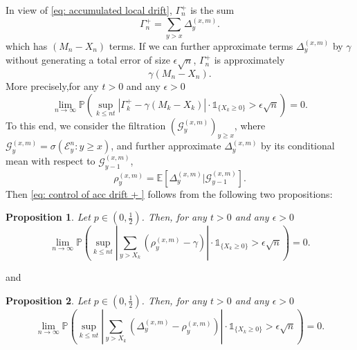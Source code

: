 \documentclass[twoside,12pt,a4paper]{article}
\newtheorem{proposition}{Proposition}[section]
\numberwithin{equation}{section}
\newcommand{\abs}[1]{\left\vert #1 \right\vert}
\begin{document}
In view of \eqref{eq: accumulated local drift}, $\Gamma_n^+$ is the sum 
$$
\Gamma_n^+ = \sum_{y>x} \Delta_y^{(x,m)}.
$$ which has $(M_n - X_n)$ terms. If we can further approximate terms $\Delta_y^{(x,m)}$ by $\gamma$ without generating a total error of size $\epsilon \sqrt{n}$, $\Gamma_n^+$ is approximately 
$$   
 \gamma (M_n - X_n).
$$
More precisely,for any $t>0$ and any $\epsilon >0$
\begin{equation}\label{eq: control of acc drift + }
	\lim_{n \to \infty }\mathbb{P}\left(\sup_{k\leq nt} \abs{\Gamma^+_k - \gamma \left(M_k - X_k \right)   }\cdot \mathbb{1}_{\{X_k\geq 0 \}} > \epsilon \sqrt{n}  \right) =0. 
\end{equation}
To this end, we consider the filtration $\left(\mathcal{G}_{y}^{(x,m)}\right)_{y\geq x}$, where $ \mathcal{G}_{y}^{(x,m)} = \sigma\left( \mathcal{E}^{n}_y : y \geq x \right)$, and further approximate $\Delta_y^{(x,m)}$ by its conditional mean with respect to $\mathcal{G}_{y-1}^{(x,m)}$,
\begin{equation}\label{eq: conditional mean}
	\rho_{y}^{(x,m)}= \mathbb{E}\left[\Delta_y^{(x,m)} | \mathcal{G}_{y-1}^{(x,m)}\right].
\end{equation}
Then \eqref{eq: control of acc drift + } follows from the following two propositions:
\begin{proposition}\label{lm: approximation of means of local drift}
		Let $p\in (0,\frac{1}{2})$. Then, for any $t>0$ and any $\epsilon >0$
		\begin{equation}\label{eq: control of expected local drift}
			\lim_{n \to \infty }\mathbb{P}\left(\sup_{k\leq nt} \abs{\sum_{y> X_k} \left( \rho_{y}^{(x,m)} - \gamma  \right)   }\cdot\mathbb{1}_{\{X_k\geq 0\}} > \epsilon \sqrt{n}  \right) =0. 
		\end{equation}
\end{proposition}
and
\begin{proposition}\label{lm: approx local drift by conditional means}
	Let $p\in (0,\frac{1}{2})$. Then, for any $t>0$ and any $\epsilon >0$
	\begin{equation}\label{eq: control of martingale difference for local drift}
		\lim_{n \to \infty }\mathbb{P}\left(\sup_{k\leq nt} \abs{\sum_{y> X_k} \left(\Delta_{y}^{(x,m)}- \rho_{y}^{(x,m)} \right)   } \cdot\mathbb{1}_{\{X_k\geq 0\}} > \epsilon \sqrt{n}  \right) =0. 
	\end{equation}
\end{proposition}
\end{document}
